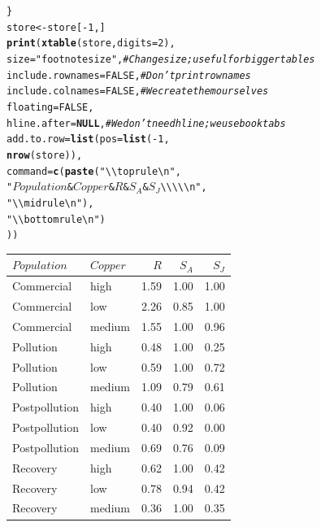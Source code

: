 \documentclass{article}\usepackage[]{graphicx}\usepackage[]{color}
\makeatletter
\newcommand{\hlnum}[1]{\textcolor[rgb]{0.686,0.059,0.569}{#1}}%
\newcommand{\hlstr}[1]{\textcolor[rgb]{0.192,0.494,0.8}{#1}}%
\newcommand{\hlcom}[1]{\textcolor[rgb]{0.678,0.584,0.686}{\textit{#1}}}%
\newcommand{\hlopt}[1]{\textcolor[rgb]{0,0,0}{#1}}%
\newcommand{\hlstd}[1]{\textcolor[rgb]{0.345,0.345,0.345}{#1}}%
\newcommand{\hlkwa}[1]{\textcolor[rgb]{0.161,0.373,0.58}{\textbf{#1}}}%
\newcommand{\hlkwb}[1]{\textcolor[rgb]{0.69,0.353,0.396}{#1}}%
\newcommand{\hlkwc}[1]{\textcolor[rgb]{0.333,0.667,0.333}{#1}}%
\newcommand{\hlkwd}[1]{\textcolor[rgb]{0.737,0.353,0.396}{\textbf{#1}}}%
\newenvironment{kframe}{%
 \def\at@end@of@kframe{}%
 \ifinner\ifhmode%
  \def\at@end@of@kframe{\end{minipage}}%
  \begin{minipage}{\columnwidth}%
 \fi\fi%
 \def\FrameCommand##1{\hskip\@totalleftmargin \hskip-\fboxsep
 \colorbox{shadecolor}{##1}\hskip-\fboxsep
     \hskip-\linewidth \hskip-\@totalleftmargin \hskip\columnwidth}%
 \MakeFramed {\advance\hsize-\width
   \@totalleftmargin\z@ \linewidth\hsize
   \@setminipage}}%
 {\par\unskip\endMakeFramed%
 \at@end@of@kframe}
\makeatother
\begin{document}
\begin{kframe}
\begin{alltt}
\hlstd{\}}
\hlstd{store}\hlkwb{<-}\hlstd{store[}\hlopt{-}\hlnum{1}\hlstd{,]}
\hlkwd{print}\hlstd{(}\hlkwd{xtable}\hlstd{(store,} \hlkwc{digits}\hlstd{=}\hlnum{2}\hlstd{),}
      \hlkwc{size}\hlstd{=}\hlstr{"footnotesize"}\hlstd{,} \hlcom{#Change size; useful for bigger tables}
      \hlkwc{include.rownames}\hlstd{=}\hlnum{FALSE}\hlstd{,} \hlcom{#Don't print rownames}
      \hlkwc{include.colnames}\hlstd{=}\hlnum{FALSE}\hlstd{,} \hlcom{#We create them ourselves}
      \hlkwc{floating}\hlstd{=}\hlnum{FALSE}\hlstd{,}
      \hlkwc{hline.after}\hlstd{=}\hlkwa{NULL}\hlstd{,} \hlcom{#We don't need hline; we use booktabs}
      \hlkwc{add.to.row} \hlstd{=} \hlkwd{list}\hlstd{(}\hlkwc{pos} \hlstd{=} \hlkwd{list}\hlstd{(}\hlopt{-}\hlnum{1}\hlstd{,}
                                   \hlkwd{nrow}\hlstd{(store)),}
                        \hlkwc{command} \hlstd{=} \hlkwd{c}\hlstd{(}\hlkwd{paste}\hlstd{(}\hlstr{"\textbackslash{}\textbackslash{}toprule \textbackslash{}n"}\hlstd{,}
                                          \hlstr{"$Population$ & $Copper$ & $R$ & $S_A$ & $S_J$ \textbackslash{}\textbackslash{}\textbackslash{}\textbackslash{}\textbackslash{}n"}\hlstd{,}
                                          \hlstr{"\textbackslash{}\textbackslash{}midrule \textbackslash{}n"}\hlstd{),}
                                    \hlstr{"\textbackslash{}\textbackslash{}bottomrule \textbackslash{}n"}\hlstd{)}
                        \hlstd{))}
\end{alltt}
\end{kframe}%
{\footnotesize
\begin{tabular}{llrrr}
  \toprule 
 $Population$ & $Copper$ & $R$ & $S_A$ & $S_J$ \\
 \midrule 
 Commercial & high & 1.59 & 1.00 & 1.00 \\ 
  Commercial & low & 2.26 & 0.85 & 1.00 \\ 
  Commercial & medium & 1.55 & 1.00 & 0.96 \\ 
  Pollution & high & 0.48 & 1.00 & 0.25 \\ 
  Pollution & low & 0.59 & 1.00 & 0.72 \\ 
  Pollution & medium & 1.09 & 0.79 & 0.61 \\ 
  Postpollution & high & 0.40 & 1.00 & 0.06 \\ 
  Postpollution & low & 0.40 & 0.92 & 0.00 \\ 
  Postpollution & medium & 0.69 & 0.76 & 0.09 \\ 
  Recovery & high & 0.62 & 1.00 & 0.42 \\ 
  Recovery & low & 0.78 & 0.94 & 0.42 \\ 
  Recovery & medium & 0.36 & 1.00 & 0.35 \\ 
   \bottomrule 
\end{tabular}
}
\end{document}
